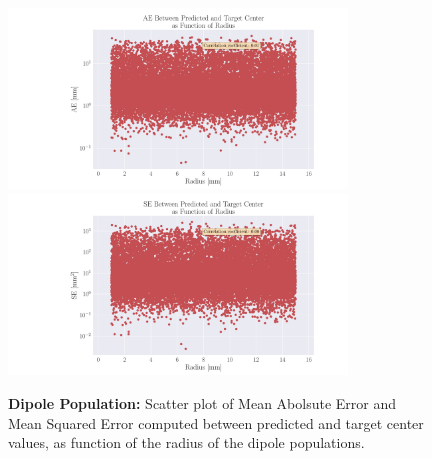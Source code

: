 \documentclass[a4paper, UKenglish, 11pt]{uiomaster}
\begin{document}
\begin{figure}
  \hspace*{-2.5cm} %
  \includegraphics[width=9cm]{figures/mae_area.pdf}
  \includegraphics[width=9cm]{figures/mse_area.pdf}
  \caption{\textbf{Dipole Population:}
  Scatter plot of Mean Abolsute Error and Mean Squared Error computed between predicted and target center values, as function of the radius of the dipole populations.}
  \label{fig:area_errors}
\end{figure}
\end{document}
